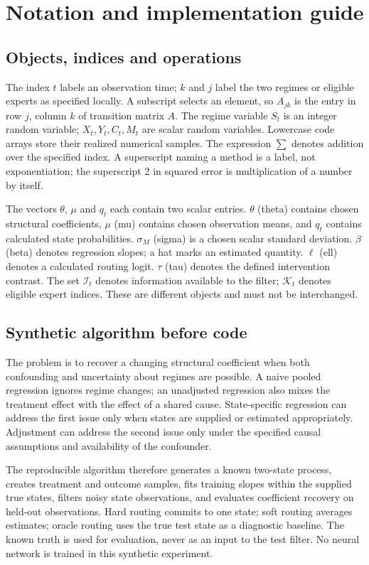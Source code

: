 \section{Notation and implementation guide}
\subsection{Objects, indices and operations}
The index $t$ labels an observation time; $k$ and $j$ label the two regimes or eligible experts as specified locally. A subscript selects an element, so $A_{jk}$ is the entry in row $j$, column $k$ of transition matrix $A$. The regime variable $S_t$ is an integer random variable; $X_t,Y_t,C_t,M_t$ are scalar random variables. Lowercase code arrays store their realized numerical samples. The expression $\sum$ denotes addition over the specified index. A superscript naming a method is a label, not exponentiation; the superscript 2 in squared error is multiplication of a number by itself.

The vectors $\theta$, $\mu$ and $q_t$ each contain two scalar entries. $\theta$ (theta) contains chosen structural coefficients, $\mu$ (mu) contains chosen observation means, and $q_t$ contains calculated state probabilities. $\sigma_M$ (sigma) is a chosen scalar standard deviation. $\beta$ (beta) denotes regression slopes; a hat marks an estimated quantity. $\ell$ (ell) denotes a calculated routing logit. $\tau$ (tau) denotes the defined intervention contrast. The set $\mathcal{I}_t$ denotes information available to the filter; $\mathcal{K}_t$ denotes eligible expert indices. These are different objects and must not be interchanged.

\subsection{Synthetic algorithm before code}
The problem is to recover a changing structural coefficient when both confounding and uncertainty about regimes are possible. A naive pooled regression ignores regime changes; an unadjusted regression also mixes the treatment effect with the effect of a shared cause. State-specific regression can address the first issue only when states are supplied or estimated appropriately. Adjustment can address the second issue only under the specified causal assumptions and availability of the confounder.

The reproducible algorithm therefore generates a known two-state process, creates treatment and outcome samples, fits training slopes within the supplied true states, filters noisy state observations, and evaluates coefficient recovery on held-out observations. Hard routing commits to one state; soft routing averages estimates; oracle routing uses the true test state as a diagnostic baseline. The known truth is used for evaluation, never as an input to the test filter. No neural network is trained in this synthetic experiment.

